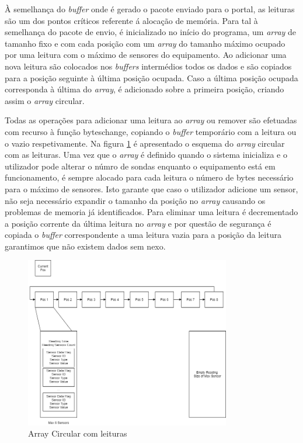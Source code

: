 \par À semelhança do \textit{buffer} onde é gerado o pacote enviado para o portal, as leituras são um dos pontos críticos referente á alocação de memória. Para tal à semelhança do pacote de envio, é inicializado no início do programa, um \textit{array} de tamanho fixo e com cada posição com um \textit{array} do tamanho máximo ocupado por uma leitura com o máximo de sensores do equipamento. Ao adicionar uma nova leitura são colocados nos \textit{buffers} intermédios todos os dados e são copiados para a posição seguinte à última posição ocupada. Caso a última posição ocupada corresponda à última do \textit{array}, é adicionado sobre a primeira posição, criando assim o \textit{array} circular.
\par Todas as operações para adicionar uma leitura ao \textit{array} ou remover são efetuadas com recurso à função byteschange, copiando o \textit{buffer} temporário com a leitura ou o vazio respetivamente. Na figura \ref{circbuf} é apresentado o esquema do \textit{array} circular com as leituras. Uma vez que o \textit{array} é definido quando o sistema inicializa e o utilizador pode alterar o númro de sondas enquanto o equipamento está em funcionamento, é sempre alocado para cada leitura o número de bytes necessário para o máximo de sensores. Isto garante que caso o utilizador adicione um sensor, não seja necessário expandir o tamanho da posição no \textit{array} causando os problemas de memoria já identificados. Para eliminar uma leitura é decrementado a posição corrente da última leitura no \textit{array} e por questão de segurança é copiada o \textit{buffer} correspondente a uma leitura vazia para a posição da leitura garantimos que não existem dados sem nexo.


\begin{figure}[ht]
\centering
\includegraphics[width=0.80\textwidth]{images/circbuf.png}
\caption{Array Circular com leituras}\label{circbuf}
\end{figure}

